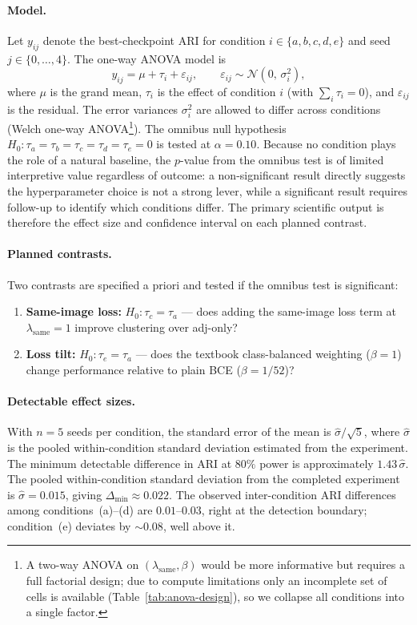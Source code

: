 \documentclass[12pt, a4paper]{article}
\begin{document}
\paragraph{Model.}
Let $y_{ij}$ denote the best-checkpoint ARI for condition
$i \in \{a,b,c,d,e\}$ and seed $j \in \{0,\dots,4\}$. The one-way ANOVA
model is
\begin{equation}
  y_{ij} = \mu + \tau_i + \varepsilon_{ij}, \qquad
  \varepsilon_{ij} \sim \mathcal{N}(0,\,\sigma_i^2),
  \label{eq:anova}
\end{equation}
where $\mu$ is the grand mean, $\tau_i$ is the effect of condition $i$
(with $\sum_i \tau_i = 0$), and $\varepsilon_{ij}$ is the residual. The
error variances $\sigma_i^2$ are allowed to differ across conditions
(Welch one-way ANOVA\footnote{A two-way ANOVA on $(\lambda_{\text{same}},
\beta)$ would be more informative but requires a full factorial design;
due to compute limitations only an incomplete set of cells is available
(Table~\ref{tab:anova-design}), so we collapse all conditions into a
single factor.}). The omnibus null hypothesis
$H_0\colon \tau_a = \tau_b = \tau_c = \tau_d = \tau_e = 0$ is tested at
$\alpha = 0.10$. Because no condition plays the role of a natural baseline,
the $p$-value from the omnibus test is of limited interpretive value
regardless of outcome: a non-significant result directly suggests the
hyperparameter choice is not a strong lever, while a significant result
requires follow-up to identify which conditions differ. The primary
scientific output is therefore the effect size and confidence interval on
each planned contrast.

\paragraph{Planned contrasts.}
Two contrasts are specified a priori and tested if the omnibus test is
significant:
\begin{enumerate}
  \item \textbf{Same-image loss:} $H_0\colon \tau_c = \tau_a$ — does adding
        the same-image loss term at $\lambda_{\text{same}}=1$ improve
        clustering over adj-only?
  \item \textbf{Loss tilt:} $H_0\colon \tau_e = \tau_a$ — does the textbook
        class-balanced weighting ($\beta=1$) change performance relative to
        plain BCE ($\beta=1/52$)?
\end{enumerate}

\paragraph{Detectable effect sizes.}
With $n = 5$ seeds per condition, the standard error of the mean is
$\hat{\sigma}/\!\sqrt{5}$, where $\hat{\sigma}$ is the pooled within-condition
standard deviation estimated from the experiment.
The minimum detectable difference in ARI at $80\%$ power is approximately
$1.43\,\hat{\sigma}$.
The pooled within-condition standard deviation from the completed experiment
is $\hat{\sigma} = 0.015$, giving $\Delta_{\min} \approx 0.022$.
The observed inter-condition ARI differences among conditions~(a)--(d) are
$0.01$--$0.03$, right at the detection boundary; condition~(e) deviates by
$\sim\!0.08$, well above it.
\end{document}
